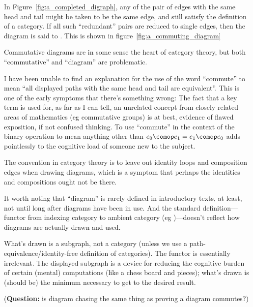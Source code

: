 \documentclass[11pt,openany]{book}
\begin{document}
In Figure~\ref{fig:a_completed_digraph}, 
any of the pair of edges with the same head and tail might be
taken to be the same edge, and still satisfy the definition of a
category. 
If all such ``redundant'' pairs are reduced to single edges,
then the diagram is said to .
This is shown in figure~\ref{fig:a_commuting_diagram}

Commutative diagrams are in some sense the heart of category
theory,
but both ``commutative'' and ``diagram'' are problematic.

I have been unable to find an explanation for the use of
the word ``commute'' to mean ``all displayed paths
with the same head and tail are equivalent''.
This is one of the early symptoms that there's something wrong:
The fact that a key term is used for, as far as I can tell, 
an unrelated concept
from closely related areas of mathematics (eg commutative groups)
is at best, evidence of flawed exposition, if not confused thinking.
To use ``commute'' in the context of the binary \compose
operation to mean anything other than $e_0 \comop e_1 = e_1 \comop e_0$
adds pointlessly to the cognitive load of someone new to the subject.

The convention in category theory is to leave out identity loops
and composition edges when drawing diagrams,
which is a symptom that perhaps the identities and compositions
ought not be there.

It worth noting that ``diagram'' is rarely defined in introductory
texts, at least, 
not until long after diagrams have been in use.
And the standard definition---functor from indexing category
to ambient category
(eg \cite[][Definition 1.6.4]{Riehl:2017:CatTheory})---doesn't reflect how
diagrams are actually drawn and used.

What's drawn is a subgraph, not a category (unless we use
a path-equivalence/identity-free definition of categories).
The functor is essentially irrelevant.
The displayed subgraph is a device for 
reducing the cognitive burden of certain (mental) computations
(like a chess board and pieces);
what's drawn is (should be) the minimum necessary 
to get to the desired result.~\cite{DutilhNovaes:2012:FormalLanguages}

(\textbf{Question:} is diagram chasing the same thing as proving
a diagram commutes?)

\label{sec:monic_epic_isic}
\end{document}
